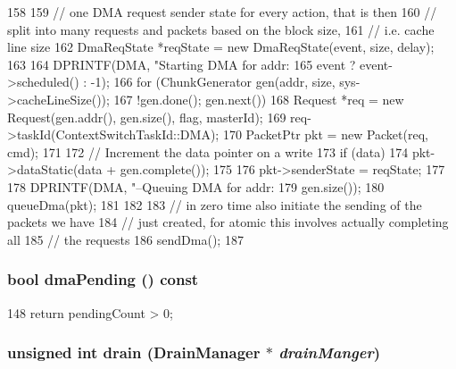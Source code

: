 \begin{DoxyCode}
158 {
159     // one DMA request sender state for every action, that is then
160     // split into many requests and packets based on the block size,
161     // i.e. cache line size
162     DmaReqState *reqState = new DmaReqState(event, size, delay);
163 
164     DPRINTF(DMA, "Starting DMA for addr: %
165             event ? event->scheduled() : -1);
166     for (ChunkGenerator gen(addr, size, sys->cacheLineSize());
167          !gen.done(); gen.next()) {
168         Request *req = new Request(gen.addr(), gen.size(), flag, masterId);
169         req->taskId(ContextSwitchTaskId::DMA);
170         PacketPtr pkt = new Packet(req, cmd);
171 
172         // Increment the data pointer on a write
173         if (data)
174             pkt->dataStatic(data + gen.complete());
175 
176         pkt->senderState = reqState;
177 
178         DPRINTF(DMA, "--Queuing DMA for addr: %
179                 gen.size());
180         queueDma(pkt);
181     }
182 
183     // in zero time also initiate the sending of the packets we have
184     // just created, for atomic this involves actually completing all
185     // the requests
186     sendDma();
187 }
\end{DoxyCode}
\hypertarget{classDmaPort_a481b9352c138101d0f84f163a760c6e5}{
\subsubsection[{dmaPending}]{\setlength{\rightskip}{0pt plus 5cm}bool dmaPending () const}}
\label{classDmaPort_a481b9352c138101d0f84f163a760c6e5}



\begin{DoxyCode}
148 { return pendingCount > 0; }
\end{DoxyCode}
\hypertarget{classDmaPort_a6bf479c521c7c3eb473822d953275b26}{
\subsubsection[{drain}]{\setlength{\rightskip}{0pt plus 5cm}unsigned int drain ({\bf DrainManager} $\ast$ {\em drainManger})}}
\label{classDmaPort_a6bf479c521c7c3eb473822d953275b26}



